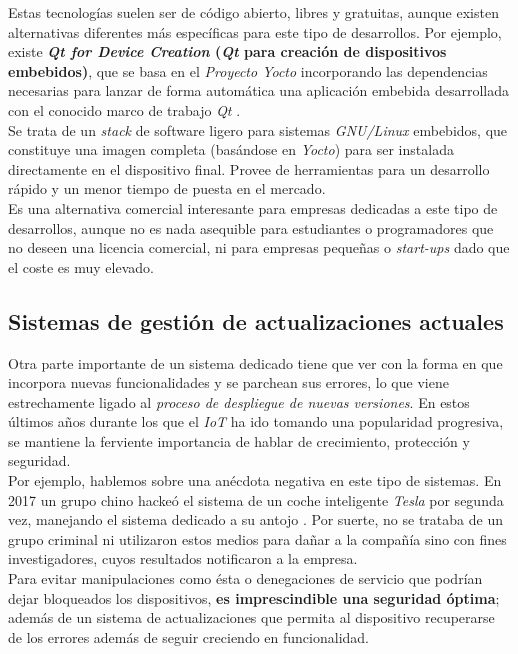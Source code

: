 Estas tecnologías suelen ser de código abierto, libres y gratuitas, aunque existen alternativas diferentes más específicas para este tipo de desarrollos. Por ejemplo, existe \textbf{\textit{Qt for Device Creation} (\textit{Qt} para creación de dispositivos embebidos)}, que se basa en el \textit{Proyecto Yocto} incorporando las dependencias necesarias para lanzar de forma automática una aplicación embebida desarrollada con el conocido marco de trabajo \textit{Qt} \cite{qt-device-creation}.\\

Se trata de un \textit{stack} de software ligero para sistemas \textit{GNU/Linux} embebidos, que constituye una imagen completa (basándose en \textit{Yocto}) para ser instalada directamente en el dispositivo final. Provee de herramientas para un desarrollo rápido y un menor tiempo de puesta en el mercado.\\

Es una alternativa comercial interesante para empresas dedicadas a este tipo de desarrollos, aunque no es nada asequible para estudiantes o programadores que no deseen una licencia comercial, ni para empresas pequeñas o \textit{start-ups} dado que el coste es muy elevado.\\

\subsection{Sistemas de gestión de actualizaciones actuales}

Otra parte importante de un sistema dedicado tiene que ver con la forma en que incorpora nuevas funcionalidades y se parchean sus errores, lo que viene estrechamente ligado al \textit{proceso de despliegue de nuevas versiones}. En estos últimos años durante los que el \textit{IoT} ha ido tomando una popularidad progresiva, se mantiene la ferviente importancia de hablar de crecimiento, protección y seguridad.\\

Por ejemplo, hablemos sobre una anécdota negativa en este tipo de sistemas. En 2017 un grupo chino hackeó el sistema de un coche inteligente \textit{Tesla} por segunda vez, manejando el sistema dedicado a su antojo \cite{tesla-system-hacked}. Por suerte, no se trataba de un grupo criminal ni utilizaron estos medios para dañar a la compañía sino con fines investigadores, cuyos resultados notificaron a la empresa.\\

Para evitar manipulaciones como ésta o denegaciones de servicio que podrían dejar bloqueados los dispositivos, \textbf{es imprescindible una seguridad óptima}; además de un sistema de actualizaciones que permita al dispositivo recuperarse de los errores además de seguir creciendo en funcionalidad.\\


